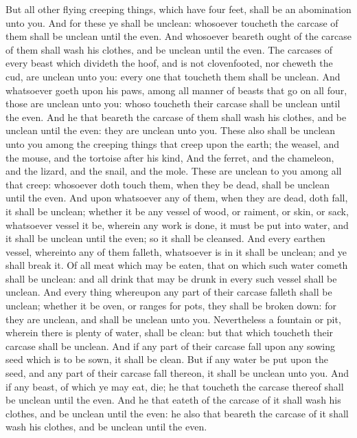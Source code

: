 \begin{biblechapter}
\verse But all other flying creeping things, which have four feet, shall be an abomination unto you.
\verse And for these ye shall be unclean: whosoever toucheth the carcase of them shall be unclean until the even.
\verse And whosoever beareth ought of the carcase of them shall wash his clothes, and be unclean until the even.
\verse The carcases of every beast which divideth the hoof, and is not clovenfooted, nor cheweth the cud, are unclean unto you: every one that toucheth them shall be unclean.
\verse And whatsoever goeth upon his paws, among all manner of beasts that go on all four, those are unclean unto you: whoso toucheth their carcase shall be unclean until the even.
\verse And he that beareth the carcase of them shall wash his clothes, and be unclean until the even: they are unclean unto you.
\verse These also shall be unclean unto you among the creeping things that creep upon the earth; the weasel, and the mouse, and the tortoise after his kind,
\verse And the ferret, and the chameleon, and the lizard, and the snail, and the mole.
\verse These are unclean to you among all that creep: whosoever doth touch them, when they be dead, shall be unclean until the even.
\verse And upon whatsoever any of them, when they are dead, doth fall, it shall be unclean; whether it be any vessel of wood, or raiment, or skin, or sack, whatsoever vessel it be, wherein any work is done, it must be put into water, and it shall be unclean until the even; so it shall be cleansed.
\verse And every earthen vessel, whereinto any of them falleth, whatsoever is in it shall be unclean; and ye shall break it.
\verse Of all meat which may be eaten, that on which such water cometh shall be unclean: and all drink that may be drunk in every such vessel shall be unclean.
\verse And every thing whereupon any part of their carcase falleth shall be unclean; whether it be oven, or ranges for pots, they shall be broken down: for they are unclean, and shall be unclean unto you.
\verse Nevertheless a fountain or pit, wherein there is plenty of water, shall be clean: but that which toucheth their carcase shall be unclean.
\verse And if any part of their carcase fall upon any sowing seed which is to be sown, it shall be clean.
\verse But if any water be put upon the seed, and any part of their carcase fall thereon, it shall be unclean unto you.
\verse And if any beast, of which ye may eat, die; he that toucheth the carcase thereof shall be unclean until the even.
\verse And he that eateth of the carcase of it shall wash his clothes, and be unclean until the even: he also that beareth the carcase of it shall wash his clothes, and be unclean until the even.

\end{biblechapter}

